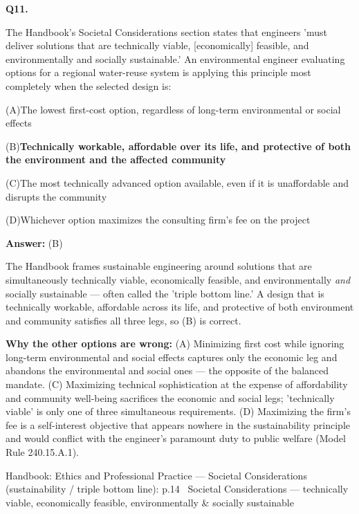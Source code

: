 \documentclass[11pt]{article}
\newcommand{\correct}[1]{\textbf{#1}\;{\color{accent}$\checkmark$}}
\newcommand{\optline}[2]{\par\noindent\hspace{1.2em}(#1)\hspace{0.6em}#2}
\begin{document}
\vspace{9pt}
\filbreak
\textbf{\color{accent}Q11.}\par\vspace{2pt}
The Handbook's Societal Considerations section states that engineers 'must deliver solutions that are technically viable, [economically] feasible, and environmentally and socially sustainable.' An environmental engineer evaluating options for a regional water-reuse system is applying this principle most completely when the selected design is:\par\par\vspace{3pt}
\optline{A}{The lowest first-cost option, regardless of long-term environmental or social effects}
\optline{B}{\correct{Technically workable, affordable over its life, and protective of both the environment and the affected community}}
\optline{C}{The most technically advanced option available, even if it is unaffordable and disrupts the community}
\optline{D}{Whichever option maximizes the consulting firm's fee on the project}
\par\vspace{3pt}
\vspace{2pt}\par\noindent\colorbox{boxbg}{\parbox{\dimexpr\linewidth-2\fboxsep\relax}{%
\vspace{2pt}\textbf{Answer:} (B)\par\vspace{2pt}
{\small The Handbook frames sustainable engineering around solutions that are simultaneously technically viable, economically feasible, and environmentally \emph{and} socially sustainable --- often called the 'triple bottom line.' A design that is technically workable, affordable across its life, and protective of both environment and community satisfies all three legs, so (B) is correct.\par
\textbf{Why the other options are wrong:} (A) Minimizing first cost while ignoring long-term environmental and social effects captures only the economic leg and abandons the environmental and social ones --- the opposite of the balanced mandate. (C) Maximizing technical sophistication at the expense of affordability and community well-being sacrifices the economic and social legs; 'technically viable' is only one of three simultaneous requirements. (D) Maximizing the firm's fee is a self-interest objective that appears nowhere in the sustainability principle and would conflict with the engineer's paramount duty to public welfare (Model Rule 240.15.A.1).\par}\par\vspace{2pt}
{\footnotesize\color{soft}Handbook: Ethics and Professional Practice --- Societal Considerations (sustainability / triple bottom line): p.14 \textbullet\ Societal Considerations --- technically viable, economically feasible, environmentally \& socially sustainable}\vspace{2pt}
}}
\end{document}
